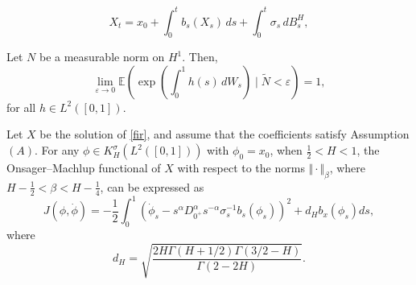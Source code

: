 \documentclass[10pt,a4paper]{amsart}
\begin{document}
\begin{equation}
    X_t = x_0 + \int_0^t b_s(X_s)\,ds + \int_0^t \sigma_s\,dB^H_s, \label{fir}
\end{equation}

	\begin{theorem}\label{estimate1}
Let \( N \) be a measurable norm on \( H^{1} \). Then, 
\[
\lim _{\varepsilon \to 0} \mathbb{E}\left( \exp \left( \int_{0}^{1} h(s) \, d W_{s} \right) \mid \tilde{N} < \varepsilon \right) = 1,
\]
for all \( h \in L^{2}([0,1]) \).
\end{theorem}

\begin{theorem} \label{result2}  Let $X$ be the solution of \eqref{fir}, and assume that the coefficients satisfy Assumption \((A)\).
For any $\phi \in K_H^\sigma(L^2([0,1]))$ with $\phi_0 = x_0$, when $ \tfrac{1}{2} < H < 1$, 
the Onsager--Machlup functional of $X$ with respect to the norms 
$\Vert \cdot \Vert_\beta$, where $H-\tfrac{1}{2}<\beta<H-\tfrac{1}{4}$, 
 can be expressed as 
	\begin{equation*}
	J(\phi,\dot{\phi})=-\frac{1}{2} \int_0^1 \left(\dot{\phi}_s-s^{\alpha}D_{0^+}^\alpha s^{-\alpha}  \sigma_s^{-1} b_s\left(\phi_s\right)\right)^2+d_H b_x(\phi_s)ds,
\end{equation*}
where
\begin{equation*}
    d_H= \sqrt{\frac{2H\Gamma(H+1/2)\Gamma(3/2-H)}{\Gamma(2-2H)}}.
\end{equation*}
\end{theorem}
\end{document}
